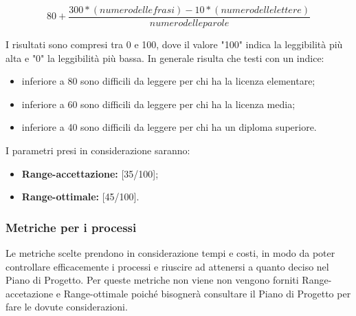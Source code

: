 		\[ 80+\frac{300*(numero delle frasi)-10*(numero delle lettere)}{numero delle parole} \]
		
		
		I risultati sono compresi tra 0 e 100, dove il valore "100" indica la leggibilità più alta e "0" la leggibilità più bassa. In generale risulta che testi con un indice:
		\begin{itemize}
			\item inferiore a 80 sono difficili da leggere per chi ha la licenza elementare;
			\item inferiore a 60 sono difficili da leggere per chi ha la licenza media;
			\item inferiore a 40 sono difficili da leggere per chi ha un diploma superiore.
		\end{itemize}
	
		I parametri presi in considerazione saranno:
	
		\begin{itemize}
			\item \textbf{Range-accettazione: }[35/100];
			\item \textbf{Range-ottimale: }[45/100].
		\end{itemize}
	
		\subsubsection{Metriche per i processi}
		Le metriche scelte prendono in considerazione tempi e costi, in modo da poter controllare efficacemente i processi e riuscire ad attenersi a quanto deciso nel Piano di Progetto. 
		Per queste metriche non viene non vengono forniti Range-accetazione e Range-ottimale poiché bisognerà consultare il Piano di Progetto per fare le dovute considerazioni.
		
